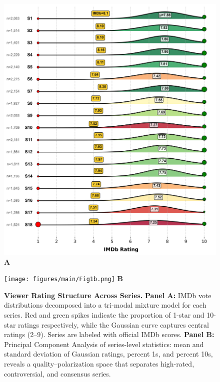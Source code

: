 \documentclass[10pt,letterpaper]{article}
\begin{document}
\begin{figure}[!h]
\centering
\begin{minipage}{0.48\linewidth}
  \centering
  \includegraphics[width=\linewidth]{figures/main/Fig1a.png}
  \vspace{1mm}
  \textbf{A}
\end{minipage}
\hfill
\begin{minipage}{0.48\linewidth}
  \centering
  \texttt{[image: figures/main/Fig1b.png]}
  \vspace{1mm}
  \textbf{B}
\end{minipage}
\caption{{\bf Viewer Rating Structure Across Series.}
\textbf{Panel A:} IMDb vote distributions decomposed into a tri-modal mixture model for each series. Red and green spikes indicate the proportion of 1-star and 10-star ratings respectively, while the Gaussian curve captures central ratings (2–9). Series are labeled with official IMDb scores. 
\textbf{Panel B:} Principal Component Analysis of series-level statistics: mean and standard deviation of Gaussian ratings, percent 1s, and percent 10s, reveals a quality–polarization space that separates high-rated, controversial, and consensus series.}
\label{fig:series_ratings}
\end{figure}
\end{document}
